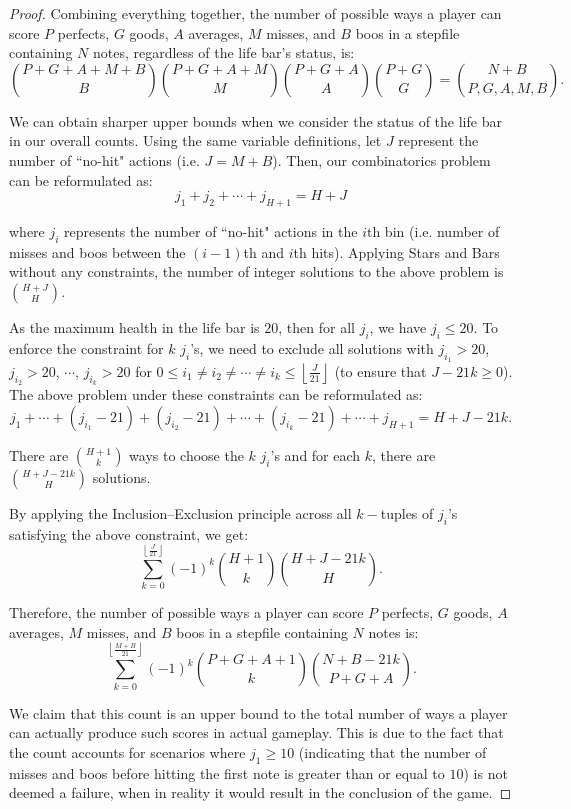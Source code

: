 \begin{proof}
Combining everything together, the number of possible ways a player can score $P$ perfects, $G$ goods, $A$ averages, $M$ misses, and $B$ boos in a stepfile containing $N$ notes, regardless of the life bar's status, is:
$$\displaystyle \binom{P+G+A+M+B}{B}\binom{P+G+A+M}{M} \binom{P + G + A}{A}\binom{P+G}{G} = \binom{N+B}{P, G, A, M, B}.$$

We can obtain sharper upper bounds when we consider the status of the life bar in our overall counts. Using the same variable definitions, let $J$ represent the number of ``no-hit" actions (i.e. $J = M + B$). Then, our combinatorics problem can be reformulated as:
$$j_1 + j_2 + \cdots + j_{H + 1} = H + J$$

where $j_i$ represents the number of ``no-hit" actions in the $i$th bin (i.e. number of misses and boos between the $(i-1)$th and $i$th hits). Applying Stars and Bars without any constraints, the number of integer solutions to the above problem is $\displaystyle \binom{H+J}{H}$.

\vspace{2mm}

As the maximum health in the life bar is $20$, then for all $j_i$, we have $j_i \leq 20$. To enforce the constraint for $k$ $j_i$'s, we need to exclude all solutions with $j_{i_1} > 20$, $j_{i_2} > 20$, $\cdots$, $j_{i_k} > 20$ for $0 \leq i_1 \neq i_2 \neq \cdots \neq i_k \leq \left\lfloor\frac{J}{21} \right\rfloor$ (to ensure that $J - 21k \geq 0$). The above problem under these constraints can be reformulated as:
$$j_1 + \cdots + (j_{i_1} - 21) + (j_{i_2} - 21) + \cdots + (j_{i_k} - 21) 
+ \cdots + j_{H + 1} = H + J - 21k.$$

There are $\displaystyle \binom{H+1}{k}$ ways to choose the $k$ $j_i$'s and for each $k$, there are $\displaystyle\binom{H+J-21k}{H}$ solutions.

\vspace{2mm}

By applying the Inclusion–Exclusion principle across all $k-$tuples of $j_i$'s satisfying the above constraint, we get:
$$\sum_{k =0}^{\left\lfloor \frac{J}{21}\right\rfloor} (-1)^k \binom{H + 1}{k}\binom{H+J-21k}{H}.$$

Therefore, the number of possible ways a player can score $P$ perfects, $G$ goods, $A$ averages, $M$ misses, and $B$ boos in a stepfile containing $N$ notes is:
$$\sum_{k =0}^{\left\lfloor \frac{M+B}{21}\right\rfloor} (-1)^k \binom{P+G+A + 1}{k}\binom{N+B-21k}{P+G+A}.$$

We claim that this count is an upper bound to the total number of ways a player can actually produce such scores in actual gameplay. This is due to the fact that the count accounts for scenarios where $j_1 \geq 10$ (indicating that the number of misses and boos before hitting the first note is greater than or equal to $10$) is not deemed a failure, when in reality it would result in the conclusion of the game. 

\end{proof}

